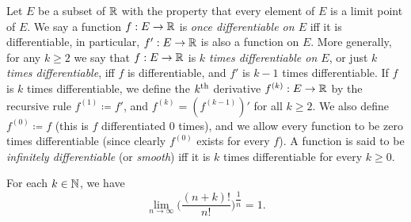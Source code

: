 \begin{defn}\label{ii:4.2.4}
  Let \(E\) be a subset of \(\mathbb{R}\) with the property that every element of \(E\) is a limit point of \(E\).
  We say a function \(f : E \to \mathbb{R}\) is \emph{once differentiable on \(E\)} iff it is differentiable, in particular, \(f': E \to \mathbb{R}\) is also a function on \(E\).
  More generally, for any \(k \geq 2\) we say that \(f : E \to \mathbb{R}\) is \emph{\(k\) times differentiable on \(E\)}, or just \emph{\(k\) times differentiable}, iff \(f\) is differentiable, and \(f'\) is \(k - 1\) times differentiable.
  If \(f\) is \(k\) times differentiable, we define the \(k^{\operatorname{th}}\) derivative \(f^{(k)} : E \to \mathbb{R}\) by the recursive rule \(f^{(1)} \coloneqq f'\), and \(f^{(k)} = (f^{(k - 1)})'\) for all \(k \geq 2\).
  We also define \(f^{(0)} \coloneqq f\) (this is \(f\) differentiated \(0\) times), and we allow every function to be zero times differentiable (since clearly \(f^{(0)}\) exists for every \(f\)).
  A function is said to be \emph{infinitely differentiable} (or \emph{smooth}) iff it is \(k\) times differentiable for every \(k \geq 0\).
\end{defn}

\begin{ac}\label{ii:ac:4.2.1}
  For each \(k \in \mathbb{N}\), we have
  \[
    \lim_{n \to \infty} \bigg(\dfrac{(n + k)!}{n!}\bigg)^{\dfrac{1}{n}} = 1.
  \]
\end{ac}

